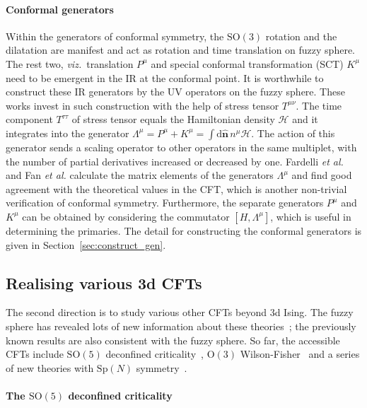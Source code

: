 \documentclass{timesjhep}
\begin{document}
\paragraph{Conformal generators~\cite{Fardelli2024,Fan2024}}

Within the generators of conformal symmetry, the $\mathrm{SO}(3)$ rotation and the dilatation are manifest and act as rotation and time translation on fuzzy sphere. The rest two, \textit{viz.}~translation $P^\mu$ and special conformal transformation (SCT) $K^\mu$ need to be emergent in the IR at the conformal point. It is worthwhile to construct these IR generators by the UV operators on the fuzzy sphere. These works invest in such construction with the help of stress tensor $T^{\mu\nu}$. The time component $T^{\tau\tau}$ of stress tensor equals the Hamiltonian density $\mathcal{H}$ and it integrates into the generator $\Lambda^\mu=P^\mu+K^\mu=\int\mathrm{d}\hat{\mathbf{n}}\,n^\mu\mathcal{H}$. The action of this generator sends a scaling operator to other operators in the same multiplet, with the number of partial derivatives increased or decreased by one. Fardelli \textit{et al.} and Fan \textit{et al.} calculate the matrix elements of the generators $\Lambda^\mu$ and find good agreement with the theoretical values in the CFT, which is another non-trivial verification of conformal symmetry. Furthermore, the separate generators $P^\mu$ and $K^\mu$ can be obtained by considering the commutator $[H,\Lambda^\mu]$, which is useful in determining the primaries. The detail for constructing the conformal generators is given in Section~\ref{sec:construct_gen}.

\subsection{Realising various 3d CFTs}

The second direction is to study various other CFTs beyond 3d Ising. The fuzzy sphere has revealed lots of new information about these theories~; the previously known results are also consistent with the fuzzy sphere. So far, the accessible CFTs include $\mathrm{SO}(5)$ deconfined criticality~\cite{Zhou2023}, $\mathrm{O}(3)$ Wilson-Fisher~\cite{Han2023Dec} and a series of new theories with $\mathrm{Sp}(N)$ symmetry~\cite{Zhou2024Oct}. 

\paragraph{The $\mathrm{SO}(5)$ deconfined criticality~\cite{Zhou2023}}
\end{document}
